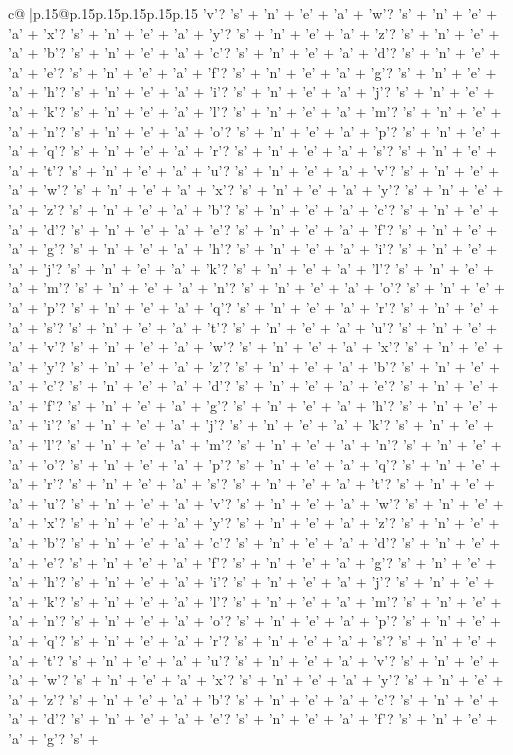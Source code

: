 \documentclass{article}
\begin{document}
{\begin{supertabular}{c@{$\;$}|p{.15\linewidth}@{}p{.15\linewidth}p{.15\linewidth}p{.15\linewidth}p{.15\linewidth}p{.15\linewidth}}
{{{'v'? 's' + 'n' + 'e' + 'a' + 'w'? 's' + 'n' + 'e' + 'a' + 'x'? 's' + 'n' + 'e' + 'a' + 'y'? 's' + 'n' + 'e' + 'a' + 'z'? 's' + 'n' + 'e' + 'a' + 'b'? 's' + 'n' + 'e' + 'a' + 'c'? 's' + 'n' + 'e' + 'a' + 'd'? 's' + 'n' + 'e' + 'a' + 'e'? 's' + 'n' + 'e' + 'a' + 'f'? 's' + 'n' + 'e' + 'a' + 'g'? 's' + 'n' + 'e' + 'a' + 'h'? 's' + 'n' + 'e' + 'a' + 'i'? 's' + 'n' + 'e' + 'a' + 'j'? 's' + 'n' + 'e' + 'a' + 'k'? 's' + 'n' + 'e' + 'a' + 'l'? 's' + 'n' + 'e' + 'a' + 'm'? 's' + 'n' + 'e' + 'a' + 'n'? 's' + 'n' + 'e' + 'a' + 'o'? 's' + 'n' + 'e' + 'a' + 'p'? 's' + 'n' + 'e' + 'a' + 'q'? 's' + 'n' + 'e' + 'a' + 'r'? 's' + 'n' + 'e' + 'a' + 's'? 's' + 'n' + 'e' + 'a' + 't'? 's' + 'n' + 'e' + 'a' + 'u'? 's' + 'n' + 'e' + 'a' + 'v'? 's' + 'n' + 'e' + 'a' + 'w'? 's' + 'n' + 'e' + 'a' + 'x'? 's' + 'n' + 'e' + 'a' + 'y'? 's' + 'n' + 'e' + 'a' + 'z'? 's' + 'n' + 'e' + 'a' + 'b'? 's' + 'n' + 'e' + 'a' + 'c'? 's' + 'n' + 'e' + 'a' + 'd'? 's' + 'n' + 'e' + 'a' + 'e'? 's' + 'n' + 'e' + 'a' + 'f'? 's' + 'n' + 'e' + 'a' + 'g'? 's' + 'n' + 'e' + 'a' + 'h'? 's' + 'n' + 'e' + 'a' + 'i'? 's' + 'n' + 'e' + 'a' + 'j'? 's' + 'n' + 'e' + 'a' + 'k'? 's' + 'n' + 'e' + 'a' + 'l'? 's' + 'n' + 'e' + 'a' + 'm'? 's' + 'n' + 'e' + 'a' + 'n'? 's' + 'n' + 'e' + 'a' + 'o'? 's' + 'n' + 'e' + 'a' + 'p'? 's' + 'n' + 'e' + 'a' + 'q'? 's' + 'n' + 'e' + 'a' + 'r'? 's' + 'n' + 'e' + 'a' + 's'? 's' + 'n' + 'e' + 'a' + 't'? 's' + 'n' + 'e' + 'a' + 'u'? 's' + 'n' + 'e' + 'a' + 'v'? 's' + 'n' + 'e' + 'a' + 'w'? 's' + 'n' + 'e' + 'a' + 'x'? 's' + 'n' + 'e' + 'a' + 'y'? 's' + 'n' + 'e' + 'a' + 'z'? 's' + 'n' + 'e' + 'a' + 'b'? 's' + 'n' + 'e' + 'a' + 'c'? 's' + 'n' + 'e' + 'a' + 'd'? 's' + 'n' + 'e' + 'a' + 'e'? 's' + 'n' + 'e' + 'a' + 'f'? 's' + 'n' + 'e' + 'a' + 'g'? 's' + 'n' + 'e' + 'a' + 'h'? 's' + 'n' + 'e' + 'a' + 'i'? 's' + 'n' + 'e' + 'a' + 'j'? 's' + 'n' + 'e' + 'a' + 'k'? 's' + 'n' + 'e' + 'a' + 'l'? 's' + 'n' + 'e' + 'a' + 'm'? 's' + 'n' + 'e' + 'a' + 'n'? 's' + 'n' + 'e' + 'a' + 'o'? 's' + 'n' + 'e' + 'a' + 'p'? 's' + 'n' + 'e' + 'a' + 'q'? 's' + 'n' + 'e' + 'a' + 'r'? 's' + 'n' + 'e' + 'a' + 's'? 's' + 'n' + 'e' + 'a' + 't'? 's' + 'n' + 'e' + 'a' + 'u'? 's' + 'n' + 'e' + 'a' + 'v'? 's' + 'n' + 'e' + 'a' + 'w'? 's' + 'n' + 'e' + 'a' + 'x'? 's' + 'n' + 'e' + 'a' + 'y'? 's' + 'n' + 'e' + 'a' + 'z'? 's' + 'n' + 'e' + 'a' + 'b'? 's' + 'n' + 'e' + 'a' + 'c'? 's' + 'n' + 'e' + 'a' + 'd'? 's' + 'n' + 'e' + 'a' + 'e'? 's' + 'n' + 'e' + 'a' + 'f'? 's' + 'n' + 'e' + 'a' + 'g'? 's' + 'n' + 'e' + 'a' + 'h'? 's' + 'n' + 'e' + 'a' + 'i'? 's' + 'n' + 'e' + 'a' + 'j'? 's' + 'n' + 'e' + 'a' + 'k'? 's' + 'n' + 'e' + 'a' + 'l'? 's' + 'n' + 'e' + 'a' + 'm'? 's' + 'n' + 'e' + 'a' + 'n'? 's' + 'n' + 'e' + 'a' + 'o'? 's' + 'n' + 'e' + 'a' + 'p'? 's' + 'n' + 'e' + 'a' + 'q'? 's' + 'n' + 'e' + 'a' + 'r'? 's' + 'n' + 'e' + 'a' + 's'? 's' + 'n' + 'e' + 'a' + 't'? 's' + 'n' + 'e' + 'a' + 'u'? 's' + 'n' + 'e' + 'a' + 'v'? 's' + 'n' + 'e' + 'a' + 'w'? 's' + 'n' + 'e' + 'a' + 'x'? 's' + 'n' + 'e' + 'a' + 'y'? 's' + 'n' + 'e' + 'a' + 'z'? 's' + 'n' + 'e' + 'a' + 'b'? 's' + 'n' + 'e' + 'a' + 'c'? 's' + 'n' + 'e' + 'a' + 'd'? 's' + 'n' + 'e' + 'a' + 'e'? 's' + 'n' + 'e' + 'a' + 'f'? 's' + 'n' + 'e' + 'a' + 'g'? 's' + }}}
\end{supertabular}}
\end{document}
